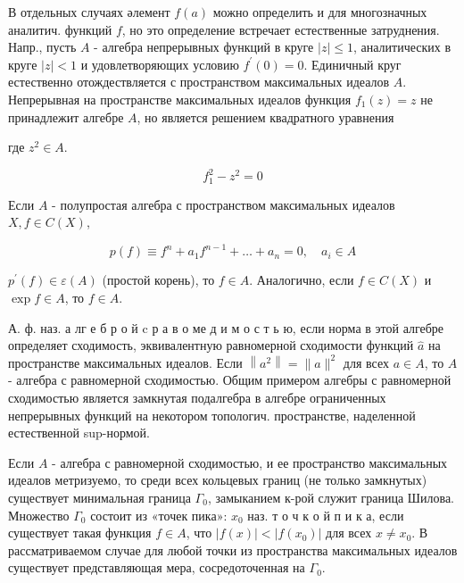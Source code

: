 \documentclass[10pt]{article}
\begin{document}
В отдельных случаях әлемент $f(a)$ можно определить и для многозначных аналитич. функций $f$, но это определение встречает естественные затруднения. Напр., пусть $A$ - алгебра непрерывных функций в круге $|z| \leqslant 1$, аналитических в круге $|z|<1$ и удовлетворяющих условию $f^{\prime}(0)=0$. Единичный круг естественно отождествляется с пространством максимальных идеалов $A$. Непрерывная на пространстве максимальных идеалов функция $f_{1}(z)=z$ не принадлежит алгебре $A$, но является решением квадратного уравнения



где $z^{2} \in A$.



\[

f_{1}^{2}-z^{2}=0

\]



Если $A$ - полупростая алгебра с пространством максимальных идеалов $X, f \in C(X)$,



\[

p(f) \equiv f^{n}+a_{1} f^{n-1}+\ldots+a_{n}=0, \quad a_{i} \in A

\]



$p^{\prime}(f) \in \varepsilon(A)$ (простой корень), то $f \in A$. Аналогично, если $f \in C(X)$ и $\exp f \in A$, то $f \in A$.



А. ф. наз. а лг е б р о й $\mathrm{c}$ р а в о ме д и м о с т ь ю, если норма в этой алгебре определяет сходимость, эквивалентную равномерной сходимости функций $\hat{a}$ на пространстве максимальных идеалов. Если $\left\|a^{2}\right\|=\|a\|^{2}$ для всех $a \in A$, то $A$ - алгебра с равномерной сходимостью. Общим примером алгебры с равномерной сходимостью является замкнутая подалгебра в алгебре ограниченных непрерывных функций на некотором топологич. пространстве, наделенной естественной sup-нормой.



Если $A$ - алгебра с равномерной сходимостью, и ее пространство максимальных идеалов метризуемо, то среди всех кольцевых границ (не только замкнутых) существует минимальная граница $\Gamma_{0}$, замыканием к-рой служит граница Шилова. Множество $\Gamma_{0}$ состоит из «точек пика»: $x_{0}$ наз. т о ч к о й п и к а, если существует такая функция $f \in A$, что $|f(x)|<\left|f\left(x_{0}\right)\right|$ для всех $x \neq x_{0}$. В рассматриваемом случае для любой точки из пространства максимальных идеалов существует представляющая мера, сосредоточенная на $\Gamma_{0}$.
\end{document}
